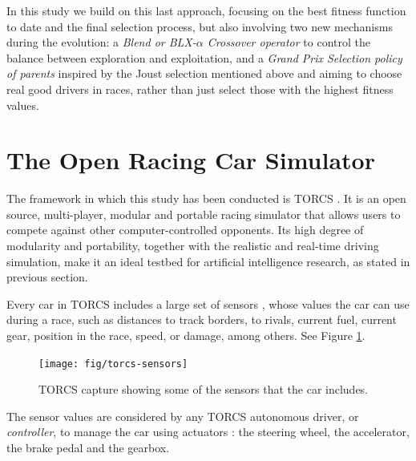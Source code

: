 \documentclass[10pt,journal,compsoc]{IEEEtran}
\begin{document}

In this study we build on this last approach, focusing on the best
fitness function to date and the final selection process, but also
involving two new mechanisms during the evolution: a \textit{Blend or
BLX-$\alpha$ Crossover operator} to control the balance between
exploration and exploitation, and a \textit{Grand Prix Selection policy of
parents} inspired by the Joust selection mentioned above and aiming to
choose real good drivers in races, rather than just select those with
the highest fitness values.



\section{The Open Racing Car Simulator}
\label{sec:torcs}

The framework in which this study has been conducted is TORCS \cite{torcs4}. It is an open source, multi-player, modular and portable racing simulator that allows users to compete against other computer-controlled opponents.
Its high degree of modularity and portability, together with the
realistic and real-time driving simulation, make it an ideal testbed
for artificial intelligence research, as stated in previous section.

Every car in TORCS includes  a large set of sensors \cite{manualTORCS},
whose values the car can use during a race, such as distances to track borders, to rivals, current fuel, current gear, position in the race, speed, or damage, among others. See Figure \ref{fig:torcs-sensors}.

\begin{figure}[!ht] 
	\begin{center}
		\texttt{[image: fig/torcs-sensors]}
		\caption {TORCS capture showing some of the sensors that the car includes.}
		\label{fig:torcs-sensors}
	\end{center}
\end{figure}


The sensor values are considered by any TORCS autonomous driver, or
{\em controller}, to manage the car using actuators \cite{manualTORCS}: the
steering wheel, the accelerator, the brake pedal and the gearbox.   
\end{document}
